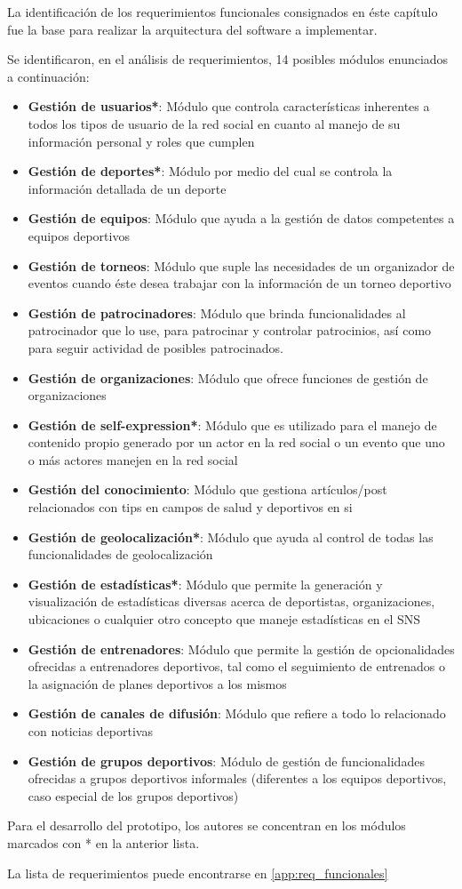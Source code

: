 La identificación de los requerimientos funcionales consignados en éste capítulo fue la base para realizar la arquitectura del software a implementar.

Se identificaron, en el análisis de requerimientos, 14 posibles módulos enunciados a continuación:

\begin{itemize}
	\item \textbf{Gestión de usuarios*}: Módulo que controla características inherentes a todos los tipos de usuario de la red social en cuanto al manejo de su información personal y roles que cumplen
	\item \textbf{Gestión de deportes*}: Módulo por medio del cual se controla la información detallada de un deporte
	\item \textbf{Gestión de equipos}: Módulo que ayuda a la gestión de datos competentes a equipos deportivos
	\item \textbf{Gestión de torneos}: Módulo que suple las necesidades de un organizador de eventos cuando éste desea trabajar con la información de un torneo deportivo
	\item \textbf{Gestión de patrocinadores}: Módulo que brinda funcionalidades al patrocinador que lo use, para patrocinar y controlar patrocinios, así como para seguir actividad de posibles patrocinados.
	\item \textbf{Gestión de organizaciones}: Módulo que ofrece funciones de gestión de organizaciones
	\item \textbf{Gestión de self-expression*}: Módulo que es utilizado para el manejo de contenido propio generado por un actor en la red social o un evento que uno o más actores manejen en la red social
	\item \textbf{Gestión del conocimiento}: Módulo que gestiona artículos/post relacionados con tips en campos de salud y deportivos en si
	\item \textbf{Gestión de geolocalización*}: Módulo que ayuda al control de todas las funcionalidades de geolocalización
	\item \textbf{Gestión de estadísticas*}: Módulo que permite la generación y visualización de estadísticas diversas acerca de deportistas, organizaciones, ubicaciones o cualquier otro concepto que maneje estadísticas en el SNS
	\item \textbf{Gestión de entrenadores}: Módulo que permite la gestión de opcionalidades ofrecidas a entrenadores deportivos, tal como el seguimiento de entrenados o la asignación de planes deportivos a los mismos
	\item \textbf{Gestión de canales de difusión}: Módulo que refiere a todo lo relacionado con noticias deportivas
	\item \textbf{Gestión de grupos deportivos}:  Módulo de gestión de funcionalidades ofrecidas a grupos deportivos informales (diferentes a los equipos deportivos, caso especial de los grupos deportivos)
\end{itemize}

Para el desarrollo del prototipo, los autores se concentran en los módulos marcados con * en la anterior lista.

La lista de requerimientos puede encontrarse en \ref{app:req_funcionales}